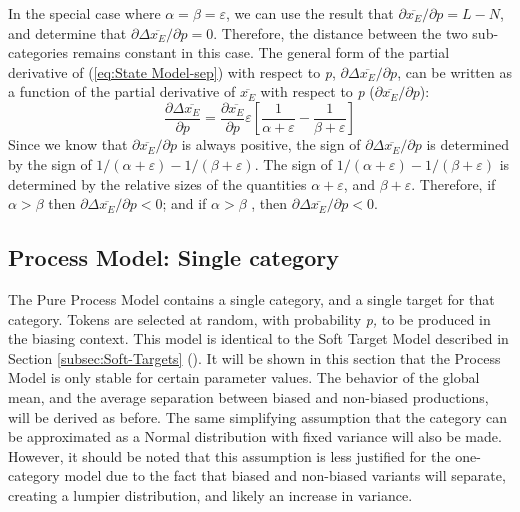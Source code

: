 In the special case where $\alpha=\beta=\varepsilon$, we can use
the result that ${\partial\overline{x_{E}}}/{\partial p}=L-N$,
and determine that ${\partial\Delta\overline{x_{E}}}/{\partial p}=0$.
Therefore, the distance between the two sub-categories remains constant
in this case. The general form of the partial derivative of (\ref{eq:State Model-sep})
with respect to \emph{p}, ${\partial\Delta\overline{x_{E}}}/{\partial p}$,
can be written as a function of the partial derivative of $\overline{x_{E}}$
with respect to \emph{p} (${\partial\overline{x_{E}}}/{\partial p}$):
\begin{equation}
\frac{\partial\Delta\overline{x_{E}}}{\partial p}=\frac{\partial\overline{x_{E}}}{\partial p}\varepsilon\left[\frac{1}{\alpha+\varepsilon}-\frac{1}{\beta+\varepsilon}\right]\label{eq: Model G: dsep/dp}
\end{equation}
Since we know that ${\partial\overline{x_{E}}}/{\partial p}$
is always positive, the sign of ${\partial\Delta\overline{x_{E}}}/{\partial p}$
is determined by the sign of ${1}/({\alpha+\varepsilon})-{1}/({\beta+\varepsilon})$.
The sign of ${1}/({\alpha+\varepsilon})-{1}/({\beta+\varepsilon})$
is determined by the relative sizes of the quantities $\alpha+\varepsilon$,
and $\beta+\varepsilon$. Therefore, if $\alpha>\beta$ then ${\partial\Delta\overline{x_{E}}}/{\partial p}<0$;
and if $\alpha>\beta$ , then ${\partial\Delta\overline{x_{E}}}/{\partial p}<0$.

\subsection{\label{subsec:Model-B:-Lengthening}Process Model: Single category}

The Pure Process Model contains a single category, and a single target
for that category. Tokens are selected at random, with probability
\emph{p,} to be produced in the biasing context. This model is identical
to the Soft Target Model described in Section \ref{subsec:Soft-Targets}
(). It will be shown in this
section that the Process Model is only stable for certain parameter
values. The behavior of the global mean, and the average separation
between biased and non-biased productions, will be derived as before.
The same simplifying assumption that the category can be approximated
as a Normal distribution with fixed variance will also be made. However,
it should be noted that this assumption is less justified for the
one-category model due to the fact that biased and non-biased variants
will separate, creating a lumpier distribution, and likely an increase
in variance.


